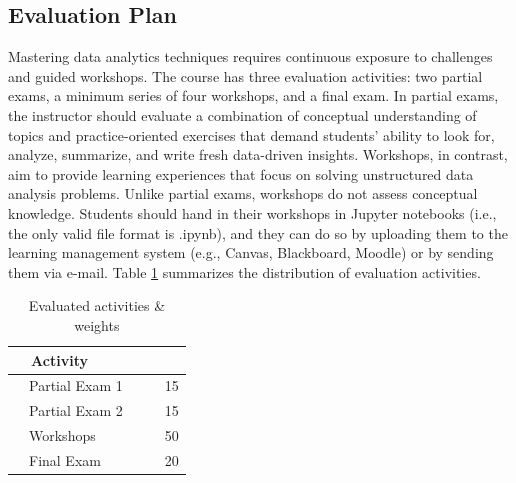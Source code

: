 \documentclass[letterpaper,11pt]{article}
\begin{document}
\subsection{Evaluation Plan}
Mastering data analytics techniques requires continuous exposure to challenges and guided workshops. The course has three evaluation activities: two partial exams, a minimum series of four workshops, and a final exam. In partial exams, the instructor should evaluate a combination of conceptual understanding of topics and practice-oriented exercises that demand students' ability to look for, analyze, summarize, and write fresh data-driven insights. Workshops, in contrast, aim to provide learning experiences that focus on solving unstructured data analysis problems. Unlike partial exams, workshops do not assess conceptual knowledge. Students should hand in their workshops in Jupyter notebooks (i.e., the only valid file format is .ipynb), and they can do so by uploading them to the learning management system (e.g., Canvas, Blackboard, Moodle) or by sending them via e-mail. Table \ref{T1} summarizes the distribution of evaluation activities.

\begin{table}[h!]
\centering
\caption{Evaluated activities \& weights}
\label{T1}
\begin{tabular}{|l|c|}
\hline
~~Activity &~~\multicolumn{1}{l|}{Percentage~~} \\ \hline
~~Partial Exam 1~~&~~15                              \\ \hline
~~Partial Exam 2~~&~~15                              \\ \hline
~~Workshops~~&~~50                              \\ \hline
~~Final Exam~~&~~20                              \\ \hline
\end{tabular}
\end{table}
\end{document}

